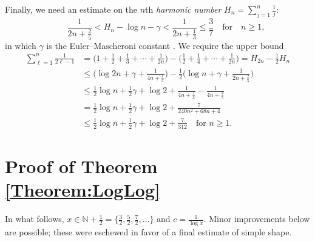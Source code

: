 \documentclass[10pt,reqno]{amsart}
\theoremstyle{plain}
\theoremstyle{definition}
\newcommand{\N}{\mathbb{N}}
\begin{document}
Finally, we need an estimate on
the $n$th \emph{harmonic number} 
$H_n = \sum_{j=1}^n \frac{1}{j}$:
\begin{equation}\label{eq:TothMare}\qquad
    \frac{1}{2n+ \frac{2}{5}} < H_n - \log n - \gamma < \frac{1}{2n + \frac{1}{3}} \leq \frac{3}{7}
    \quad\text{for}\quad 
    n \geq 1,
\end{equation}
in which $\gamma$ is the Euler--Mascheroni constant \cite{TothMare}.   We require the upper bound
\begin{align}
\sum_{\ell=1}^n \frac{1}{2\ell - 1}
&= \Big(1 + \frac{1}{2} + \frac{1}{3} + \cdots + \frac{1}{2n}\Big) - \Big( \frac{1}{2} + \frac{1}{4} + \cdots + \frac{1}{2n} \Big)
= H_{2n} - \frac{1}{2} H_n  \nonumber \\
&\leq \bigg(\log 2n +\gamma + \frac{1}{4n + \frac{1}{3}} \bigg) - \frac{1}{2} \bigg( \log n + \gamma + \frac{1}{2n+\frac{2}{5}} \bigg) \nonumber \\
&\leq \frac{1}{2}\log n + \frac{1}{2}\gamma + \log 2 + \frac{1}{4n + \frac{1}{3}}- \frac{1}{4n+\frac{4}{5}} \nonumber \\
&= \frac{1}{2}\log n + \frac{1}{2}\gamma + \log 2 +  \frac{7}{240 n^2+68 n+4} \nonumber\\
&\leq \frac{1}{2}\log n + \frac{1}{2}\gamma + \log 2 +  \frac{7}{312}
\quad \text{for $n \geq 1$}. \label{eq:HarmSum}
\end{align}

\section{Proof of Theorem \ref{Theorem:LogLog}}\label{Section:Proof}

In what follows, $x\in \N+ \frac{1}{2} = \{ \frac{3}{2}, \frac{5}{2}, \frac{7}{2},\ldots\}$ and $c= \frac{1}{\log x}$.
Minor improvements below are possible; these were eschewed in favor of
a final estimate of simple shape.

\end{document}
